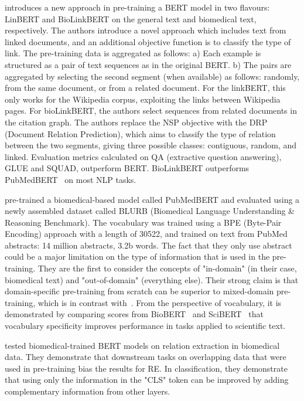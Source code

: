 \cite{yasunaga2020linkbert} introduces a new approach in pre-training a BERT model in two flavours: LinBERT and BioLinkBERT on the general text and biomedical text, respectively.
The authors introduce a novel approach which includes text from linked documents, and an additional objective function is to classify the type of link.
The pre-training data is aggregated as follows: a) Each example is structured as a pair of text sequences as in the original BERT. b) The pairs are aggregated by selecting the second segment (when available) as follows: randomly, from the same document, or from a related document. For the linkBERT, this only works for the Wikipedia corpus, exploiting the links between Wikipedia pages. For bioLinkBERT, the authors select sequences from related documents in the citation graph. 
The authors replace the NSP objective with the DRP (Document Relation Prediction), which aims to classify the type of relation between the two segments, giving three possible classes: contiguous, random, and linked.  
Evaluation metrics calculated on QA (extractive question answering), GLUE and SQUAD, outperform BERT. BioLinkBERT outperforms PubMedBERT~\cite{gu2020pubmedbert} on most NLP tasks. 

\cite{gu2020pubmedbert} pre-trained a biomedical-based model called PubMedBERT and evaluated using a newly assembled dataset called BLURB (Biomedical Language Understanding \& Reasoning Benchmark). 
The vocabulary was trained using a BPE (Byte-Pair Encoding) approach with a length of 30522, and trained on text from PubMed abstracts: 14 million abstracts, 3.2b words. 
The fact that they only use abstract could be a major limitation on the type of information that is used in the pre-training. 
They are the first to consider the concepts of "in-domain" (in their case, biomedical text) and "out-of-domain" (everything else). 
Their strong claim is that domain-specific pre-training from scratch can be superior to mixed-domain pre-training, which is in contrast with~\cite{hong2022ScholarBERT}. 
From the perspective of vocabulary, it is demonstrated by comparing scores from BioBERT~\cite{lee2019biobert} and SciBERT~\cite{Beltagy2019SciBERT} that vocabulary specificity improves performance in tasks applied to scientific text. 

\cite{su2022investigation} tested biomedical-trained BERT models on relation extraction in biomedical data. They demonstrate that downstream tasks on overlapping data that were used in pre-training bias the results for RE. In classification, they demonstrate that using only the information in the "CLS" token can be improved by adding complementary information from other layers. 

